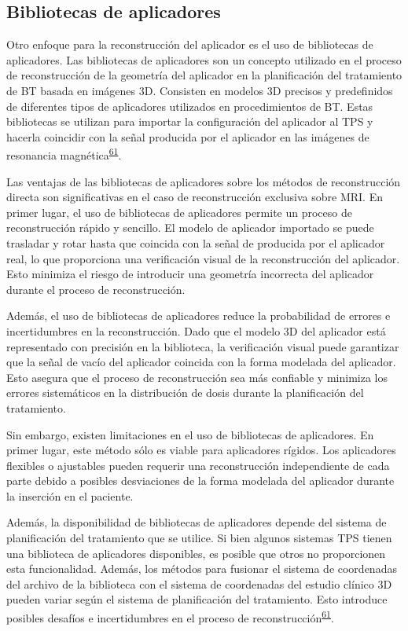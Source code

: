 \documentclass[
  a4paper,
]{scrreprt}
\begin{document}
\hypertarget{sec-bibapp}{%
\subsection{Bibliotecas de aplicadores}\label{sec-bibapp}}

Otro enfoque para la reconstrucción del aplicador es el uso de
bibliotecas de aplicadores. Las bibliotecas de aplicadores son un
concepto utilizado en el proceso de reconstrucción de la geometría del
aplicador en la planificación del tratamiento de BT basada en imágenes
3D. Consisten en modelos 3D precisos y predefinidos de diferentes tipos
de aplicadores utilizados en procedimientos de BT. Estas bibliotecas se
utilizan para importar la configuración del aplicador al TPS y hacerla
coincidir con la señal producida por el aplicador en las imágenes de
resonancia
magnética\textsuperscript{\protect\hyperlink{ref-hellebust2010}{61}}.

Las ventajas de las bibliotecas de aplicadores sobre los métodos de
reconstrucción directa son significativas en el caso de reconstrucción
exclusiva sobre MRI. En primer lugar, el uso de bibliotecas de
aplicadores permite un proceso de reconstrucción rápido y sencillo. El
modelo de aplicador importado se puede trasladar y rotar hasta que
coincida con la señal de producida por el aplicador real, lo que
proporciona una verificación visual de la reconstrucción del aplicador.
Esto minimiza el riesgo de introducir una geometría incorrecta del
aplicador durante el proceso de reconstrucción.

Además, el uso de bibliotecas de aplicadores reduce la probabilidad de
errores e incertidumbres en la reconstrucción. Dado que el modelo 3D del
aplicador está representado con precisión en la biblioteca, la
verificación visual puede garantizar que la señal de vacío del aplicador
coincida con la forma modelada del aplicador. Esto asegura que el
proceso de reconstrucción sea más confiable y minimiza los errores
sistemáticos en la distribución de dosis durante la planificación del
tratamiento.

Sin embargo, existen limitaciones en el uso de bibliotecas de
aplicadores. En primer lugar, este método sólo es viable para
aplicadores rígidos. Los aplicadores flexibles o ajustables pueden
requerir una reconstrucción independiente de cada parte debido a
posibles desviaciones de la forma modelada del aplicador durante la
inserción en el paciente.

Además, la disponibilidad de bibliotecas de aplicadores depende del
sistema de planificación del tratamiento que se utilice. Si bien algunos
sistemas TPS tienen una biblioteca de aplicadores disponibles, es
posible que otros no proporcionen esta funcionalidad. Además, los
métodos para fusionar el sistema de coordenadas del archivo de la
biblioteca con el sistema de coordenadas del estudio clínico 3D pueden
variar según el sistema de planificación del tratamiento. Esto introduce
posibles desafíos e incertidumbres en el proceso de
reconstrucción\textsuperscript{\protect\hyperlink{ref-hellebust2010}{61}}.
\end{document}
